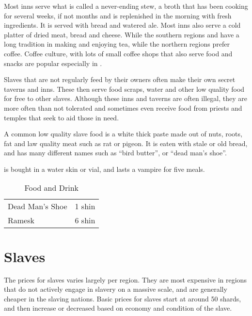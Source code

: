 Most inns serve what is called a never-ending stew, a broth that has been
cooking for several weeks, if not months and is replenished in the morning
with fresh ingredients. It is served with bread and watered ale. Most inns
also serve a cold platter of dried meat, bread and cheese. While the southern
regions and  have a long tradition in making and
enjoying tea, while the northern regions prefer coffee. Coffee culture, with
lots of small coffee shops that also serve food and snacks are popular
especially in .

Slaves that are not regularly feed by their owners often make their own
secret taverns and inns. These then serve food scraps, water and other low
quality food for free to other slaves. Although these inns and taverns are
often illegal, they are more often than not tolerated and sometimes even
receive food from priests and temples that seek to aid those in need.

A common low quality slave food is a white thick paste made out of nuts,
roots, fat and law quality meat such as rat or pigeon. It is eaten with
stale or old bread, and has many different names such as ``bird butter'',
or ``dead man's shoe''.

 is bought in a water skin or vial, and lasts a vampire
for five meals.

\begin{table*}
  \caption{Food and Drink} \label{tbl:Food and Drink}
  \begin{tabular}{p{10cm} l}
    Dead Man's Shoe             &  1 shin \\
    Ramesk                      &  6 shin \\
  \end{tabular}
\end{table*}

\section{Slaves}
\label{sec:Slave Prices}

The prices for slaves varies largely per region. They are most expensive in
regions that do not actively engage in slavery on a massive scale, and are
generally cheaper in the slaving nations. Basic prices for slaves start at
around 50 shards, and then increase or decreased based on economy and
condition of the slave.

